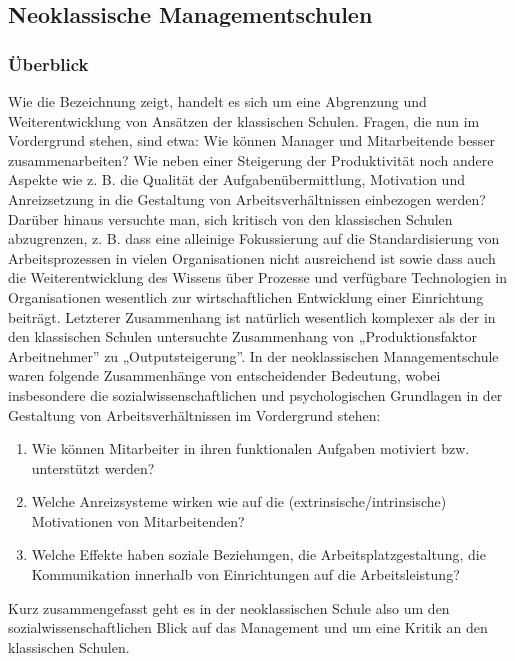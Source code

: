 \documentclass[
  letterpaper,
]{book}
\begin{document}
\subsection{Neoklassische
Managementschulen}\label{neoklassische-managementschulen}

\subsubsection{Überblick}\label{uxfcberblick-1}

Wie die Bezeichnung zeigt, handelt es sich um eine Abgrenzung und
Weiterentwicklung von Ansätzen der klassischen Schulen. Fragen, die nun
im Vordergrund stehen, sind etwa: Wie können Manager und Mitarbeitende
besser zusammenarbeiten? Wie neben einer Steigerung der Produktivität
noch andere Aspekte wie z. B. die Qualität der Aufgabenübermittlung,
Motivation und Anreizsetzung in die Gestaltung von Arbeitsverhältnissen
einbezogen werden? Darüber hinaus versuchte man, sich kritisch von den
klassischen Schulen abzugrenzen, z. B. dass eine alleinige Fokussierung
auf die Standardisierung von Arbeitsprozessen in vielen Organisationen
nicht ausreichend ist sowie dass auch die Weiterentwicklung des Wissens
über Prozesse und verfügbare Technologien in Organisationen wesentlich
zur wirtschaftlichen Entwicklung einer Einrichtung beiträgt. Letzterer
Zusammenhang ist natürlich wesentlich komplexer als der in den
klassischen Schulen untersuchte Zusammenhang von „Produktionsfaktor
Arbeitnehmer'' zu „Outputsteigerung''. In der neoklassischen
Managementschule waren folgende Zusammenhänge von entscheidender
Bedeutung, wobei insbesondere die sozialwissenschaftlichen und
psychologischen Grundlagen in der Gestaltung von Arbeitsverhältnissen im
Vordergrund stehen:

\begin{enumerate}
\def\labelenumi{\arabic{enumi}.}
\item
  Wie können Mitarbeiter in ihren funktionalen Aufgaben motiviert bzw.
  unterstützt werden?
\item
  Welche Anreizsysteme wirken wie auf die (extrinsische/intrinsische)
  Motivationen von Mitarbeitenden?
\item
  Welche Effekte haben soziale Beziehungen, die Arbeitsplatzgestaltung,
  die Kommunikation innerhalb von Einrichtungen auf die Arbeitsleistung?
\end{enumerate}

Kurz zusammengefasst geht es in der neoklassischen Schule also um den
sozialwissenschaftlichen Blick auf das Management und um eine Kritik an
den klassischen Schulen.
\end{document}
